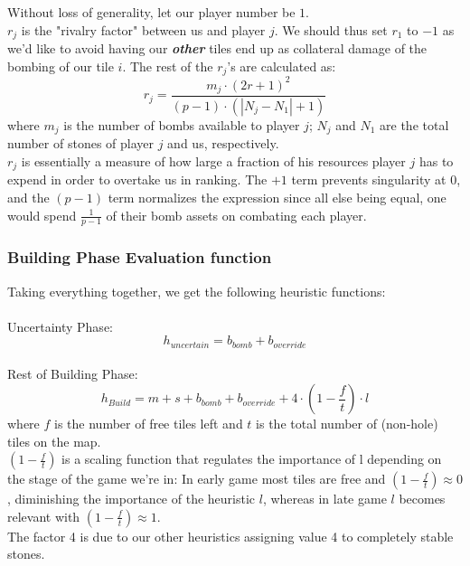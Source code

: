 \documentclass[a4paper,12pt]{article}
\begin{document}
Without loss of generality, let our player number be $1$. \\
$r_j$ is the "rivalry factor" between us and player $j$. We should thus set $r_1$ to $-1$ as we'd like to avoid having our \textbf{\textit{other}} tiles end up as collateral damage of the bombing of our tile $i$. The rest of the $r_j$'s are calculated as: \\
\[r_j = \frac{m_j \cdot (2r+1)^2}{(p-1) \cdot (|N_j - N_1| + 1)} \]
where $m_j$ is the number of bombs available to player $j$; $N_j$ and $N_1$ are the total number of stones of player $j$ and us, respectively. \\
$r_j$ is essentially a measure of how large a fraction of his resources player $j$ has to expend in order to overtake us in ranking. The $+1$ term prevents singularity at $0$, and the $(p-1)$ term normalizes the expression since all else being equal, one would spend $\frac{1}{p-1}$ of their bomb assets on combating each player.


\subsubsection{Building Phase Evaluation function}
Taking everything together, we get the following heuristic functions: \\
\\
Uncertainty Phase: \\
\[h_{uncertain} = b_{bomb} + b_{override} \]
\\
Rest of Building Phase: \\
\[ h_{Build} = m + s + b_{bomb} + b_{override} + 4 \cdot (1-\frac{f}{t}) \cdot l \]
where $f$ is the number of free tiles left and $t$ is the total number of (non-hole) tiles on the map. \\
$(1-\frac{f}{t})$ is a scaling function that regulates the importance of l depending on the stage of the game we're in: In early game most tiles are free and $(1-\frac{f}{t}) \approx 0$, diminishing the importance of the heuristic $l$, whereas in late game $l$ becomes relevant with $(1-\frac{f}{t}) \approx 1$. \\
The factor 4 is due to our other heuristics assigning value 4 to completely stable stones.
\end{document}
